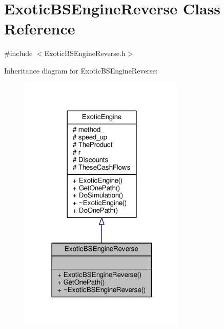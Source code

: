 \hypertarget{classExoticBSEngineReverse}{}\section{Exotic\+B\+S\+Engine\+Reverse Class Reference}
\label{classExoticBSEngineReverse}


{\ttfamily \#include $<$Exotic\+B\+S\+Engine\+Reverse.\+h$>$}



Inheritance diagram for Exotic\+B\+S\+Engine\+Reverse\+:
\nopagebreak
\begin{figure}[H]
\begin{center}
\leavevmode
\includegraphics[width=226pt]{classExoticBSEngineReverse__inherit__graph}
\end{center}
\end{figure}


